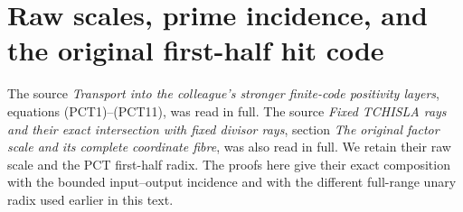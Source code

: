 \section{Raw scales, prime incidence, and the original first-half hit code}

The source \emph{Transport into the colleague's stronger finite-code
positivity layers}, equations (PCT1)--(PCT11), was read in full.
The source \emph{Fixed TCHISLA rays and their exact intersection with
fixed divisor rays}, section \emph{The original factor scale and its
complete coordinate fibre}, was also read in full.  We retain their
raw scale and the PCT first-half radix.  The proofs here give their
exact composition with the bounded input--output incidence and with
the different full-range unary radix used earlier in this text.

